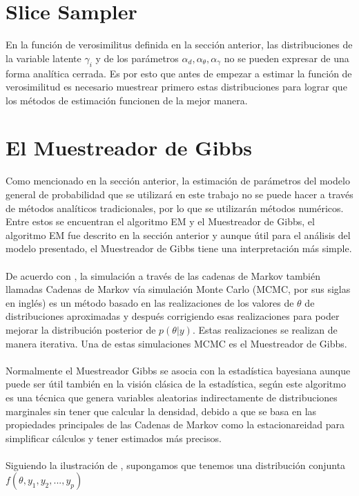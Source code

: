 \section{Slice Sampler}
En la funci\'on de verosimilitus definida en la secci\'on anterior, las distribuciones de la variable latente $\gamma_i$ y de los par\'ametros $\alpha_d,\alpha_\theta,\alpha_\gamma$ no se pueden expresar de una forma anal\'itica cerrada. Es por esto que antes de empezar a estimar la funci\'on de verosimilitud es necesario muestrear primero estas distribuciones para lograr que los m\'etodos de estimaci\'on funcionen de la mejor manera. 
\section{El Muestreador de Gibbs}
Como mencionado en la secci\'on anterior, la estimaci\'on de par\'ametros del modelo general de probabilidad que se utilizar\'a en este trabajo no se puede hacer a trav\'es de m\'etodos anal\'iticos tradicionales, por lo que se utilizar\'an m\'etodos num\'ericos. Entre estos se encuentran el algoritmo EM y el Muestreador de Gibbs, el algoritmo EM fue descrito en la secci\'on anterior y aunque \'util para el an\'alisis del modelo presentado, el Muestreador de Gibbs tiene una interpretaci\'on m\'as simple.\\
\\
De acuerdo con \cite{gelman2014bayesian}, la simulaci\'on a trav\'es de las cadenas de Markov tambi\'en llamadas Cadenas de Markov v\'ia simulaci\'on Monte Carlo (MCMC, por sus siglas en ingl\'es) es un m\'etodo basado en las realizaciones de los valores de $\theta$ de distribuciones aproximadas y despu\'es corrigiendo esas realizaciones para poder mejorar la distribuci\'on posterior de $p(\theta|y)$. Estas realizaciones se realizan de manera iterativa. Una de estas simulaciones MCMC es el Muestreador de Gibbs.\\
\\
Normalmente el Muestreador Gibbs se asocia con la estad\'istica bayesiana aunque puede ser \'util tambi\'en en la visi\'on cl\'asica de la estad\'istica, seg\'un \cite{casella1992explaining} este algoritmo es una t\'ecnica que genera variables aleatorias indirectamente de distribuciones marginales sin tener que calcular la densidad, debido a que se basa en las propiedades principales de las Cadenas de Markov como la estacionareidad para simplificar c\'alculos y tener estimados m\'as precisos.\\
\\
Siguiendo la ilustraci\'on de \cite{casella1992explaining}, supongamos que tenemos una distribuci\'on conjunta $f(\theta,y_1,y_2,...,y_p)$\\
